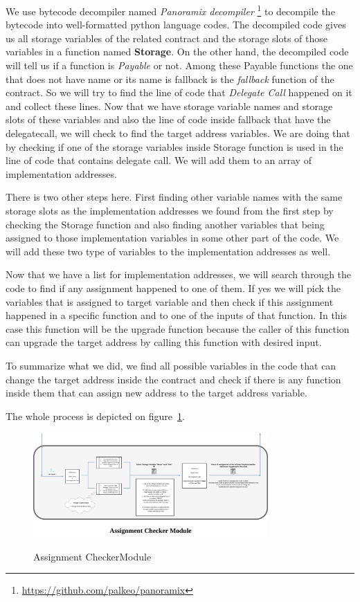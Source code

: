 We use bytecode decompiler named \textit{Panoramix decompiler} \footnote{\url{https://github.com/palkeo/panoramix}} to decompile the bytecode into well-formatted python language codes. The decompiled code gives us all storage variables of the related contract and the storage slots of those variables in a function named \textbf{Storage}. On the other hand, the decompiled code will tell us if a function is \textit{Payable} or not. Among these Payable functions the one that does not have name or its name is fallback is the \textit{fallback} function of the contract. So we will try to find the line of code that \textit{Delegate Call} happened on it and collect these lines. Now that we have storage variable names and storage slots of these variables and also the line of code inside fallback that have the delegatecall, we will check to find the target address variables. We are doing that by checking if one of the storage variables inside Storage function is used in the line of code that contains delegate call. We will add them to an array of implementation addresses.

There is two other steps here. First finding other variable names with the same storage slots as the implementation addresses we found from the first step by checking the Storage function and also finding another variables that being assigned to those implementation variables in some other part of the code. We will add these two type of variables to the implementation addresses as well.

Now that we have a list for implementation addresses, we will search through the code to find if any assignment happened to one of them. If yes we will pick the variables that is assigned to target variable and then check if this assignment happened in a specific function and to one of the inputs of that function. In this case this function will be the upgrade function because the caller of this function can upgrade the target address by calling this function with desired input. 

To summarize what we did, we find all possible variables in the code that can change the target address inside the contract and check if there is any function inside them that can assign new address to the target address variable.

The whole process is depicted on figure~\ref{assignmentFinder}.

\begin{figure}[t]
  \includegraphics[width=0.8\textwidth]{figures/Assignment_finder.png}\label{assignmentFinder}
  \caption{Assignment CheckerModule}
\end{figure}



